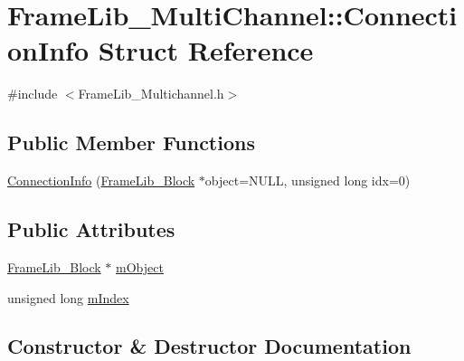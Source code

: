 \hypertarget{struct_frame_lib___multi_channel_1_1_connection_info}{}\section{Frame\+Lib\+\_\+\+Multi\+Channel\+:\+:Connection\+Info Struct Reference}
\label{struct_frame_lib___multi_channel_1_1_connection_info}


{\ttfamily \#include $<$Frame\+Lib\+\_\+\+Multichannel.\+h$>$}

\subsection*{Public Member Functions}
\begin{DoxyCompactItemize}
\item 
\hyperlink{struct_frame_lib___multi_channel_1_1_connection_info_a31e20c0207d8a54945759cfbe0bfb8dc}{Connection\+Info} (\hyperlink{class_frame_lib___block}{Frame\+Lib\+\_\+\+Block} $\ast$object=N\+U\+LL, unsigned long idx=0)
\end{DoxyCompactItemize}
\subsection*{Public Attributes}
\begin{DoxyCompactItemize}
\item 
\hyperlink{class_frame_lib___block}{Frame\+Lib\+\_\+\+Block} $\ast$ \hyperlink{struct_frame_lib___multi_channel_1_1_connection_info_a69b915998854a851374567e7fed7a09d}{m\+Object}
\item 
unsigned long \hyperlink{struct_frame_lib___multi_channel_1_1_connection_info_a1c5e57c99d6ce5ce6b5751fa76b5d787}{m\+Index}
\end{DoxyCompactItemize}


\subsection{Constructor \& Destructor Documentation}
\mbox{\label{struct_frame_lib___multi_channel_1_1_connection_info_a31e20c0207d8a54945759cfbe0bfb8dc}} 
